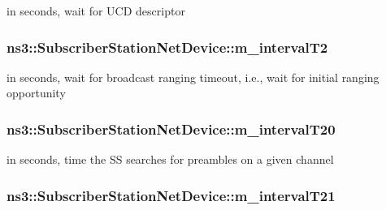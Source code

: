 in seconds, wait for U\+CD descriptor 

\subsubsection[{\texorpdfstring{m\+\_\+interval\+T2}{m_intervalT2}}]{ ns3\+::\+Subscriber\+Station\+Net\+Device\+::m\+\_\+interval\+T2\hspace{0.3cm}{\ttfamily [private]}}\hypertarget{classns3_1_1SubscriberStationNetDevice_a1569e3230118e8fa0fabbc23d2acd5d9}{}\label{classns3_1_1SubscriberStationNetDevice_a1569e3230118e8fa0fabbc23d2acd5d9}


in seconds, wait for broadcast ranging timeout, i.\+e., wait for initial ranging opportunity 

\subsubsection[{\texorpdfstring{m\+\_\+interval\+T20}{m_intervalT20}}]{ ns3\+::\+Subscriber\+Station\+Net\+Device\+::m\+\_\+interval\+T20\hspace{0.3cm}{\ttfamily [private]}}\hypertarget{classns3_1_1SubscriberStationNetDevice_a61ceb1f7700107f6de7200ef2c2b5aec}{}\label{classns3_1_1SubscriberStationNetDevice_a61ceb1f7700107f6de7200ef2c2b5aec}


in seconds, time the SS searches for preambles on a given channel 

\subsubsection[{\texorpdfstring{m\+\_\+interval\+T21}{m_intervalT21}}]{ ns3\+::\+Subscriber\+Station\+Net\+Device\+::m\+\_\+interval\+T21\hspace{0.3cm}{\ttfamily [private]}}\hypertarget{classns3_1_1SubscriberStationNetDevice_a417f513119092187ab4dd66875c7e429}{}\label{classns3_1_1SubscriberStationNetDevice_a417f513119092187ab4dd66875c7e429}


